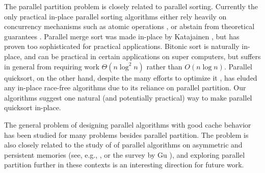 \documentclass[11pt]{article}
\renewcommand{\paragraph}[1]{\vspace{0.09in}\noindent{\bf \boldmath #1.}}
\theoremstyle{remark}
\theoremstyle{remark}
\begin{document}
The parallel partition problem is closely related to parallel
sorting. Currently the only practical in-place parallel sorting
algorithms either rely heavily on concurrency mechanisms such as
atomic operations \cite{HeidelbergerNo90, AxtmannWi17, TsigasZh03}, or
abstain from theoretical guarantees \cite{FrancisPa92}. Parallel merge
sort \cite{Hagerup89} was made in-place by Katajainen
\cite{Katajainen93}, but has proven too sophisticated for practical
applications. Bitonic sort \cite{BlellochLe98} is naturally in-place,
and can be practical in certain applications on super computers, but
suffers in general from requiring work $\Theta(n \log^2 n)$ rather
than $O(n \log n)$. Parallel quicksort, on the other hand, despite the
many efforts to optimize it \cite{HeidelbergerNo90, AxtmannWi17,
  TsigasZh03, FrancisPa92, Frias08}, has eluded any in-place race-free
algorithms due to its reliance on parallel partition. Our algorithms
suggest one natural (and potentially practical) way to make parallel
quicksort in-place.

The general problem of designing parallel algorithms with good cache
behavior has been studied for many problems
\cite{blelloch2020improved, ParallelCacheAlg1, ParallelCacheAlg2,
  ParallelCacheAlg3, ParallelCacheAlg4, ParallelCacheAlg5,
  ParallelCacheAlg6} besides parallel partition. The problem is also
closely related to the study of of parallel algorithms on asymmetric
and persistent memories (see, e.g.,
\cite{blelloch2018parallel,ben2016parallel,blelloch2015sorting,gu2018survey,blelloch2018parallel2},
or the survey by Gu \cite{gu2018survey}), and exploring parallel
partition further in these contexts is an interesting direction for
future work.


\end{document}
